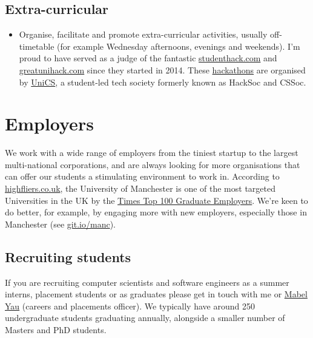 \documentclass[12pt,]{book}
\providecommand{\tightlist}{%
  \setlength{\itemsep}{0pt}\setlength{\parskip}{0pt}}
\begin{document}
\hypertarget{extra-curricular}{%
\section{Extra-curricular}\label{extra-curricular}}

\begin{itemize}
\tightlist
\item
  Organise, facilitate and promote extra-curricular activities, usually off-timetable (for example Wednesday afternoons, evenings and weekends). I'm proud to have served as a judge of the fantastic \href{https://www.studenthack.com}{studenthack.com} and \href{https://greatunihack.com}{greatunihack.com} since they started in 2014. These \href{https://medium.com/tfogo/hackathons-are-for-beginners-77a9c9c0e000}{hackathons} are organised by \href{https://www.unicsmcr.com/}{UniCS}, a student-led tech society formerly known as HackSoc and CSSoc.
\end{itemize}

\hypertarget{employers}{%
\chapter{Employers}\label{employers}}

We work with a wide range of employers from the tiniest startup to the largest multi-national corporations, and are always looking for more organisations that can offer our students a stimulating environment to work in. According to \href{https://www.highfliers.co.uk}{highfliers.co.uk}, the University of Manchester is one of the most targeted Universities in the UK by the \href{https://www.top100graduateemployers.com}{Times Top 100 Graduate Employers}. We're keen to do better, for example, by engaging more with new employers, especially those in Manchester (see \href{https://git.io/manc}{git.io/manc}).

\hypertarget{recruiting-students}{%
\section{Recruiting students}\label{recruiting-students}}

If you are recruiting computer scientists and software engineers as a summer interns, placement students or as graduates please get in touch with me or \href{https://uk.linkedin.com/in/mabel-yau}{Mabel Yau} (careers and placements officer). We typically have around 250 undergraduate students graduating annually, alongside a smaller number of Masters and PhD students.
\end{document}
